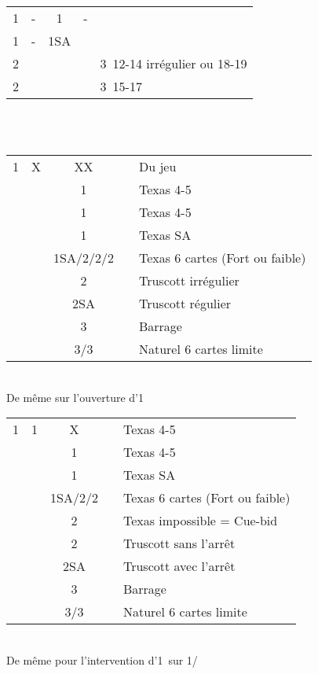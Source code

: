 \documentclass[a4paper, oneside, 11pt]{report}
\begin{document}
		\begin{tabular}{cccc|l}
		1\trefle & - & 1\coeur & - &\\
		1\pique  & - & 1SA &&\\
		2\trefle &&&& 3\coeur\ 12-14 irrégulier ou 18-19\\
		2\coeur &&&& 3\coeur\ 15-17\\
		\end{tabular}\\\\

		\begin{tabular}{cccc|l}
		1\trefle & X & XX && Du jeu\\
		&& 1\carreau && Texas 4-5\coeur\\
		&& 1\coeur && Texas 4-5\pique\\
		&& 1\pique && Texas SA\\
		&& 1SA/2\trefle/2\carreau/2\coeur && Texas 6 cartes (Fort ou faible)\\
		&& 2\pique && Truscott irrégulier\\
		&& 2SA && Truscott régulier\\
		&& 3\trefle && Barrage\\
		&& 3\coeur/3\pique && Naturel 6 cartes limite\\
		\end{tabular}\\
		De même sur l'ouverture d'1\carreau\\

		\begin{tabular}{cccc|l}
		1\trefle & 1\carreau & X && Texas 4-5\coeur\\
		&& 1\coeur && Texas 4-5\pique\\
		&& 1\pique && Texas SA\\
		&& 1SA/2\carreau/2\coeur && Texas 6 cartes (Fort ou faible)\\
		&& 2\trefle && Texas impossible = Cue-bid\\
		&& 2\pique && Truscott sans l'arrêt \carreau\\
		&& 2SA && Truscott avec l'arrêt \carreau\\
		&& 3\trefle && Barrage\\
		&& 3\coeur/3\pique && Naturel 6 cartes limite\\
		\end{tabular}\\
		De même pour l'intervention d'1\coeur\ sur 1\trefle/\carreau\\
\end{document}
